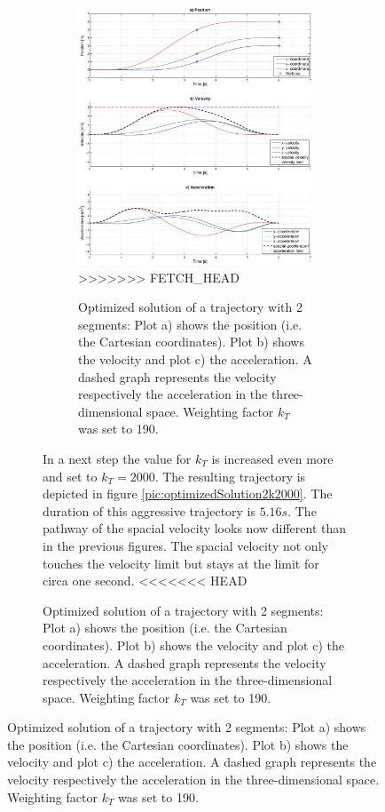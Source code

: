 \begin{figure}[h]
\begin{figure}[H]
\begin{figure}[H]
   \centering
   \includegraphics[trim = 33mm 20mm 30mm 33mm,width=1\textwidth]{pics/2SegOpti6s01k190.eps}
>>>>>>> FETCH_HEAD
   \caption{Optimized solution of a trajectory with 2 segments: Plot a) shows the position (i.e. the Cartesian coordinates). Plot b) shows the velocity and plot c) the acceleration. A dashed graph represents the velocity respectively the acceleration in the three-dimensional space. Weighting factor $k_T$ was set to 190.}
   \label{pic:optimizedSolution2k190}
\end{figure}


In a next step the value for $k_T$ is increased even more and set to $k_T = 2000$. The resulting trajectory is depicted in figure \ref{pic:optimizedSolution2k2000}. The duration of this aggressive trajectory is $5.16s$. The pathway of the spacial velocity looks now different than in the previous figures. The spacial velocity not only touches the velocity limit but stays at the limit for circa one second.
<<<<<<< HEAD


\end{figure}
\end{figure}
